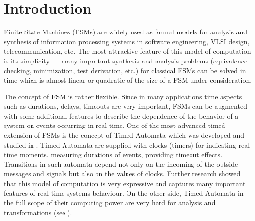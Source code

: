 \documentclass[conference]{IEEEtran}
\begin{document}
\section{Introduction}

Finite State Machines (FSMs) are widely used as formal models for analysis and synthesis of information processing systems in software engineering, VLSI design, telecommunication, etc. The most attractive feature of this model of computation is its simplicity --- many important synthesis and analysis problems (equivalence checking, minimization, test derivation, etc.) for classical FSMs can be solved in time which is almost linear or quadratic of the size of a FSM under consideration. 

The concept of FSM is rather flexible. Since in many applications time aspects such as durations, delays, timeouts are very important, FSMs can be augmented with some additional features to describe the dependence of the behavior of a system on events occurring in real time. One of the most advanced timed extension of FSMs is the concept of Timed Automata which was developed and studied in \cite{alur}. Timed Automata are supplied with clocks (timers) for indicating real time moments, measuring durations of events, providing timeout effects. Transitions in such automata depend not only on the incoming of the outside messages and signals but also on the values of clocks. Further research showed that this model of computation is very expressive and captures many important features of real-time systems behaviour. On the other side, Timed Automata in the full scope of their computing power are very hard for analysis and transformations (see \cite{alur2,finkel}). 
\end{document}
